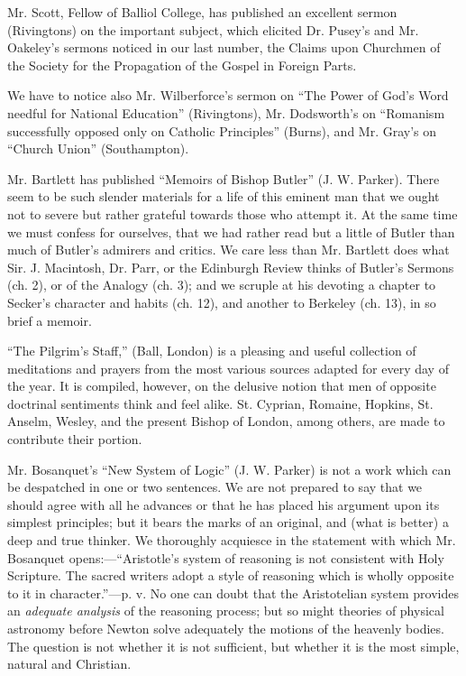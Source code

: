 Mr. Scott, Fellow of Balliol College, has published
an excellent sermon (Rivingtons) on the important subject, which
elicited Dr. Pusey's and Mr. Oakeley's sermons noticed in our last
number, the Claims upon Churchmen of the Society for the Propagation of
the Gospel in Foreign Parts.

We have to notice also Mr. Wilberforce's sermon on ``The
Power of God's Word needful for National Education'' (Rivingtons), Mr.
Dodsworth's on ``Romanism successfully opposed only on Catholic
Principles'' (Burns), and Mr. Gray's on ``Church Union'' (Southampton).

Mr. Bartlett has published ``Memoirs of Bishop
Butler'' (J. W. Parker). There seem to be such slender materials for a
life of this eminent man that we ought not to severe but rather grateful
towards those who attempt it. At the same time we must confess for
ourselves, that we had rather read but a little of Butler than much of
Butler's admirers and critics. We care less than Mr. Bartlett does what
Sir. J. Macintosh, Dr. Parr, or the Edinburgh Review thinks of Butler's
Sermons (ch. 2), or of the Analogy (ch. 3); and we scruple at his
devoting a chapter to Secker's character and habits (ch. 12), and
another to Berkeley (ch. 13), in so brief a memoir.

``The Pilgrim's Staff,'' (Ball, London) is a pleasing
and useful collection of meditations and prayers from the most various
sources adapted for every day of the year. It is compiled, however, on
the delusive notion that men of opposite doctrinal sentiments think and
feel alike. St. Cyprian, Romaine, Hopkins, St. Anselm, Wesley, and the
present Bishop of London, among others, are made to contribute their
portion.

Mr. Bosanquet's ``New System of Logic'' (J. W.
Parker) is not a work which can be despatched in one or two sentences.
We are not prepared to say that we should agree with all he advances or
that he has placed his argument upon its simplest principles; but it
bears the marks of an original, and (what is better) a deep and true
thinker. We thoroughly acquiesce in the statement with which Mr.
Bosanquet opens:—``Aristotle's system of reasoning is not consistent
with Holy Scripture. The sacred writers adopt a style of reasoning which
is wholly opposite to it in character.''—p. v. No one can doubt that
the Aristotelian system provides an \emph{adequate analysis} of the
reasoning process; but so might theories of physical astronomy before
Newton solve adequately the motions of the heavenly bodies. The question
is not whether it is not sufficient, but whether it is the most simple,
natural and Christian.


